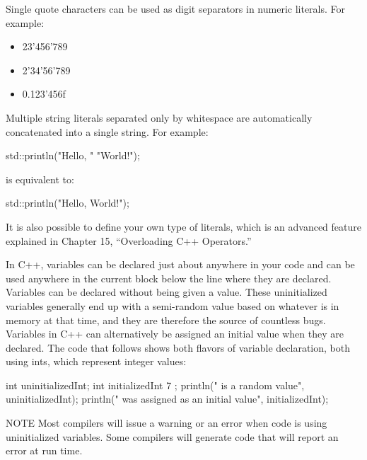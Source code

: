Single quote characters can be used as digit separators in numeric literals. For example:

\begin{itemize}
\item
23'456'789

\item
2'34'56'789

\item
0.123'456f
\end{itemize}

Multiple string literals separated only by whitespace are automatically concatenated into a single string. For example:

\begin{cpp}
std::println("Hello, "
             "World!");
\end{cpp}

is equivalent to:

\begin{cpp}
std::println("Hello, World!");
\end{cpp}

It is also possible to define your own type of literals, which is an advanced feature explained in Chapter 15, “Overloading C++ Operators.”


In C++, variables can be declared just about anywhere in your code and can be used anywhere in the current block below the line where they are declared. Variables can be declared without being given a value. These uninitialized variables generally end up with a semi-random value based on whatever is in memory at that time, and they are therefore the source of countless bugs. Variables in C++ can alternatively be assigned an initial value when they are declared. The code that follows shows both flavors of variable declaration, both using ints, which represent integer values:

\begin{cpp}
int uninitializedInt;
int initializedInt { 7 };
println("{} is a random value", uninitializedInt);
println("{} was assigned as an initial value", initializedInt);
\end{cpp}

\begin{myNotic}{NOTE}
Most compilers will issue a warning or an error when code is using uninitialized variables. Some compilers will generate code that will report an error at run time.
\end{myNotic}

